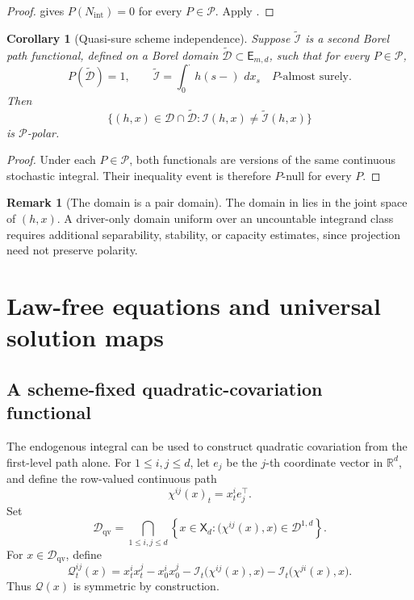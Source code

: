 \documentclass[11pt,reqno]{amsart}
\theoremstyle{plain}
\newtheorem{corollary}[corollary]{Corollary}
\theoremstyle{definition}
\newtheorem{remark}[remark]{Remark}
\newcommand{\R}{\mathbb R}
\newcommand{\cD}{\mathcal D}
\newcommand{\cI}{\mathcal I}
\newcommand{\cP}{\mathcal P}
\newcommand{\dd}{\,d}
\newcommand{\qv}{\mathcal Q}
\begin{document}
\begin{proof}
 gives
\(P(N_{\mathrm{int}})=0\) for every \(P\in\cP\).  Apply
.
\end{proof}

\begin{corollary}[Quasi-sure scheme independence]
\label{cor:scheme-independence}
Suppose \(\widetilde{\cI}\) is a second Borel path functional, defined on a
Borel domain \(\widetilde{\cD}\subset\mathsf E_{m,d}\), such that for every
\(P\in\cP\),
\[
  P(\widetilde{\cD})=1,
  \qquad
  \widetilde{\cI}
  =
  \int_0^\cdot h(s-)\,\dd x_s
  \quad P\text{-almost surely}.
\]
Then
\[
  \bigl\{(h,x)\in\cD\cap\widetilde{\cD}:
    \cI(h,x)\ne\widetilde{\cI}(h,x)\bigr\}
\]
is \(\cP\)-polar.
\end{corollary}

\begin{proof}
Under each \(P\in\cP\), both functionals are versions of the same continuous
stochastic integral.  Their inequality event is therefore \(P\)-null for
every \(P\).
\end{proof}

\begin{remark}[The domain is a pair domain]\label{rem:pair-domain}
The domain in  lies in the joint space of
\((h,x)\).  A driver-only domain uniform over an uncountable integrand class
requires additional separability, stability, or capacity estimates, since
projection need not preserve polarity.
\end{remark}

\section{Law-free equations and universal solution maps}
\label{sec:equations}

\subsection{A scheme-fixed quadratic-covariation functional}

The endogenous integral can be used to construct quadratic covariation from
the first-level path alone.  For \(1\le i,j\le d\), let \(e_j\) be the
\(j\)-th coordinate vector in \(\R^d\), and define the row-valued continuous
path
\begin{equation}\label{eq:coordinate-integrand}
  \chi^{ij}(x)_t=x_t^i e_j^\top .
\end{equation}
Set
\begin{equation}\label{eq:Dqv}
  \cD_{\mathrm{qv}}
  =
  \bigcap_{1\le i,j\le d}
  \left\{
    x\in\mathsf X_d:
    \bigl(\chi^{ij}(x),x\bigr)\in\cD^{1,d}
  \right\}.
\end{equation}
For \(x\in\cD_{\mathrm{qv}}\), define
\begin{equation}\label{eq:pathwise-qv}
  \qv_t^{ij}(x)
  =
  x_t^ix_t^j-x_0^ix_0^j
  -
  \cI_t\bigl(\chi^{ij}(x),x\bigr)
  -
  \cI_t\bigl(\chi^{ji}(x),x\bigr).
\end{equation}
Thus \(\qv(x)\) is symmetric by construction.
\end{document}
